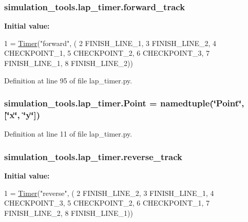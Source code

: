 \subsubsection[{\texorpdfstring{forward\+\_\+track}{forward_track}}]{\setlength{\rightskip}{0pt plus 5cm}simulation\+\_\+tools.\+lap\+\_\+timer.\+forward\+\_\+track}\hypertarget{namespacesimulation__tools_1_1lap__timer_aab75b520d524490f7b0bdcf6b28761a6}{}\label{namespacesimulation__tools_1_1lap__timer_aab75b520d524490f7b0bdcf6b28761a6}
{\bfseries Initial value\+:}
\begin{DoxyCode}
1 = \hyperlink{classsimulation__tools_1_1lap__timer_1_1_timer}{Timer}(\textcolor{stringliteral}{"forward"}, (
2     FINISH\_LINE\_1,
3     FINISH\_LINE\_2,
4     CHECKPOINT\_1,
5     CHECKPOINT\_2,
6     CHECKPOINT\_3,
7     FINISH\_LINE\_1,
8     FINISH\_LINE\_2))
\end{DoxyCode}


Definition at line 95 of file lap\+\_\+timer.\+py.

\subsubsection[{\texorpdfstring{Point}{Point}}]{\setlength{\rightskip}{0pt plus 5cm}simulation\+\_\+tools.\+lap\+\_\+timer.\+Point = namedtuple(\char`\"{}Point\char`\"{}, \mbox{[}\char`\"{}x\char`\"{}, \char`\"{}y\char`\"{}\mbox{]})}\hypertarget{namespacesimulation__tools_1_1lap__timer_a55d342023a9bdc266a2ee262040e8d19}{}\label{namespacesimulation__tools_1_1lap__timer_a55d342023a9bdc266a2ee262040e8d19}


Definition at line 11 of file lap\+\_\+timer.\+py.

\subsubsection[{\texorpdfstring{reverse\+\_\+track}{reverse_track}}]{\setlength{\rightskip}{0pt plus 5cm}simulation\+\_\+tools.\+lap\+\_\+timer.\+reverse\+\_\+track}\hypertarget{namespacesimulation__tools_1_1lap__timer_a05166a035886cf7f2693a8f72dc05bbc}{}\label{namespacesimulation__tools_1_1lap__timer_a05166a035886cf7f2693a8f72dc05bbc}
{\bfseries Initial value\+:}
\begin{DoxyCode}
1 = \hyperlink{classsimulation__tools_1_1lap__timer_1_1_timer}{Timer}(\textcolor{stringliteral}{"reverse"}, (
2     FINISH\_LINE\_2,
3     FINISH\_LINE\_1,
4     CHECKPOINT\_3,
5     CHECKPOINT\_2,
6     CHECKPOINT\_1,
7     FINISH\_LINE\_2,
8     FINISH\_LINE\_1))
\end{DoxyCode}


